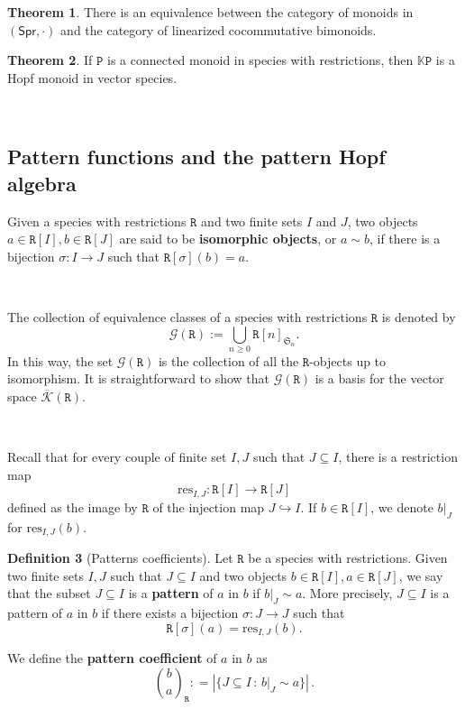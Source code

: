\documentclass[12pt, reqno]{amsart}
\theoremstyle{definition}
\newtheorem{thm}{Theorem}[section]
\newtheorem{defin}[thm]{Definition}
\newcommand{\Spr}{\mathsf{Spr}} %
\newcommand{\prP}{\mathtt{P}}
\newcommand{\prR}{\mathtt{R}}
\newcommand{\Kc}{\mathcal{K}}
\newcommand{\Kcb}{\overline{\Kc}}
\begin{document}
\begin{thm}\label{MonRestr1}
There is an equivalence between the category of monoids in $(\Spr, \cdot)$ and the category of linearized cocommutative bimonoids.
\end{thm}


\begin{thm}\label{MonRestr2}
If $\prP$ is a connected monoid in species with restrictions, then $\mathbb{K}\prP$ is a Hopf monoid in vector species.
\end{thm}

\

\subsection{Pattern functions and the pattern Hopf algebra}


Given a species with restrictions $\prR$ and two finite sets $I$ and $J$, two objects $a\in \prR[I], b\in \prR[J]$ are said to be {\bf isomorphic objects}, or $a\sim b$, if there is a bijection $\sigma:I\to J$ such that $\prR[\sigma](b)=a$. 

\

The collection of equivalence classes of a species with restrictions $\prR$ is denoted by \begin{equation}
\mathcal{G}(\prR) := \bigcup_{n\geq 0 } \prR[n]_{\mathfrak{S}_n}.
\end{equation}
In this way, the set $\mathcal G(\prR) $ is the collection of all the $\prR$-objects up to isomorphism. It is straightforward to show that $\mathcal{G}(\prR)$ is a basis for the vector space $\Kcb(\prR)$.

\

Recall that for every couple of finite set $I,J$ such that $J \subseteq I$, there is a restriction map 
\[\text{res}_{I,J}: \prR[I] \to \prR[J]\]
defined as the image by $\prR$ of the injection map $J \hookrightarrow I$. If $b \in \prR[I]$, we denote $b|_J$ for $\text{res}_{I,J}(b)$.

\begin{defin}[Patterns coefficients]\label{defin:patterncoeff}
Let $\prR$ be a species with restrictions. Given two finite sets $I,J$ such that $J \subseteq I$ and two objects $b\in \prR[I], a\in \prR[J]$,
we say that the subset $J \subseteq I$ is a {\bf pattern} of $a$ in $b$ if $b|_{J} \sim a$. More precisely, $J \subseteq I$ is a pattern of $a$ in $b$ if there exists a bijection $\sigma: J \to J$ such that
\[\prR[\sigma](a)=\text{res}_{I,J}(b).\]

We define the {\bf pattern coefficient} of $a$ in $b$ as
\begin{equation}
    \binom{b}{a}_{\!\prR} : = \left| \{J \subseteq I \, : \, b|_J \sim a \} \right| \, .
\end{equation}
\end{defin}
\end{document}
